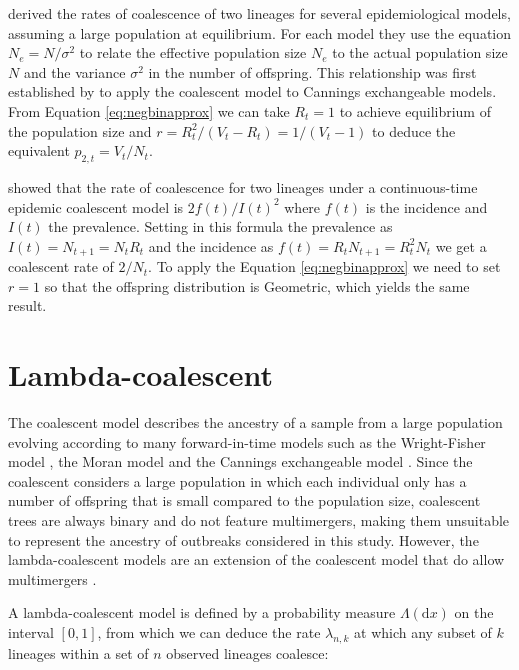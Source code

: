 \documentclass{article}
\begin{document}
\citet{koelleRatesCoalescenceCommon2012} derived the rates of coalescence of two lineages 
for several epidemiological models, assuming a large population at equilibrium.
For each model they use the equation $N_e=N/\sigma^2$ to relate the effective population
size $N_e$ to the actual population size $N$ and the variance $\sigma^2$ in the number
of offspring. This relationship was first established by \citet{Kingman1982} to
apply the coalescent model to Cannings exchangeable models. 
From Equation \eqref{eq:negbinapprox} we can take $R_t=1$ to achieve 
equilibrium of the population size and $r=R_t^2/(V_t-R_t)=1/(V_t-1)$ to deduce 
the equivalent $p_{2,t}=V_t/N_t$. 

\citet{Volz2012a} showed that the rate of coalescence for two lineages under a continuous-time epidemic coalescent model is $2f(t)/I(t)^2$
 where $f(t)$ is the incidence and $I(t)$ the prevalence. 
 Setting in this formula the prevalence as $I(t)=N_{t+1}=N_t R_t$ and the incidence as
 $f(t)=R_t N_{t+1}=R_t^2 N_t$ we get a coalescent rate of 
 $2/N_t$. To apply the Equation \eqref{eq:negbinapprox} we need to set $r=1$ 
 so that the offspring distribution is Geometric, which yields the same result.

\section{Lambda-coalescent}

The coalescent model \citep{Kingman1982,Kingman1982a} describes the ancestry of a sample from a large population 
evolving according to many forward-in-time models such as the Wright-Fisher model \citep{Wright1931,Fisher1930}, 
the Moran model \citep{Moran1958} and the Cannings exchangeable model \citep{Cannings1974}.
Since the coalescent considers a large population in which each individual only has a number of offspring that is small
compared to the population size, coalescent trees are always binary and do not feature multimergers,
making them unsuitable to represent the ancestry of outbreaks considered in this study.
However, the lambda-coalescent models are an extension of the coalescent model that do
allow multimergers
\citep{pitmanCoalescentsMultipleCollisions1999,sagitovGeneralCoalescentAsynchronous1999,donnellyParticleRepresentationsMeasureValued1999}. 

A lambda-coalescent model is defined by a probability measure 
$\Lambda(\mathrm{d} x)$ on the interval $[0,1]$, from which we can deduce
the rate $\lambda_{n,k}$ at which any subset of $k$ lineages within a set of $n$ observed lineages 
coalesce:
\end{document}
